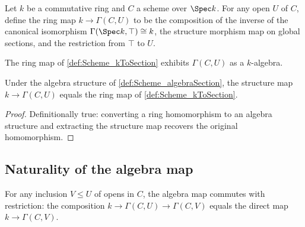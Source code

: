 \begin{definition}
  \label{def:Scheme_kToSection}
  
  Let \(k\) be a commutative ring and \(C\) a scheme over \(\Spec k\). For any open \(U\) of \(C\), define the ring map \(k \to \Gamma(C, U)\) to be the composition of the inverse of the canonical isomorphism \(\Gamma(\Spec k, \top) \cong k\), the structure morphism map on global sections, and the restriction from \(\top\) to \(U\).
\end{definition}

\begin{definition}
  \label{def:Scheme_algebraSection}

  The ring map of \cref{def:Scheme_kToSection} exhibits \(\Gamma(C, U)\) as a \(k\)-algebra.
\end{definition}

\begin{lemma}
  \label{lem:Scheme_algebraMap_eq_kToSection}

  Under the algebra structure of \cref{def:Scheme_algebraSection}, the structure map \(k \to \Gamma(C, U)\) equals the ring map of \cref{def:Scheme_kToSection}.
\end{lemma}

\begin{proof}
  
  \leanok
  Definitionally true: converting a ring homomorphism to an algebra structure and extracting the structure map recovers the original homomorphism.
\end{proof}

\subsection{Naturality of the algebra map}

\begin{lemma}
  \label{lem:Scheme_kToSection_naturality}

  For any inclusion \(V \le U\) of opens in \(C\), the algebra map commutes with restriction: the composition \(k \to \Gamma(C, U) \to \Gamma(C, V)\) equals the direct map \(k \to \Gamma(C, V)\).
\end{lemma}

